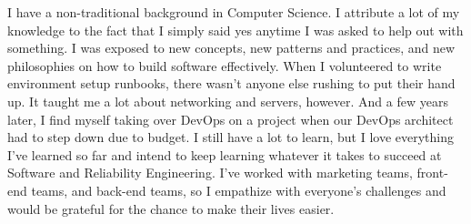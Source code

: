\documentclass[11pt, letterpaper]{awesome-cv}
\begin{document}
\begin{cvletter}
I have a non-traditional background in Computer Science. I attribute a lot of my knowledge to the fact that I simply said yes anytime I was asked to help out with something. I was exposed to new concepts, new patterns and practices, and new philosophies on how to build software effectively. When I volunteered to write environment setup runbooks, there wasn't anyone else rushing to put their hand up. It taught me a lot about networking and servers, however. And a few years later, I find myself taking over DevOps on a project when our DevOps architect had to step down due to budget. I still have a lot to learn, but I love everything I've learned so far and intend to keep learning whatever it takes to succeed at Software and Reliability Engineering. I've worked with marketing teams, front-end teams, and back-end teams, so I empathize with everyone's challenges and would be grateful for the chance to make their lives easier.

\end{cvletter}


\makeletterclosing
\end{document}
